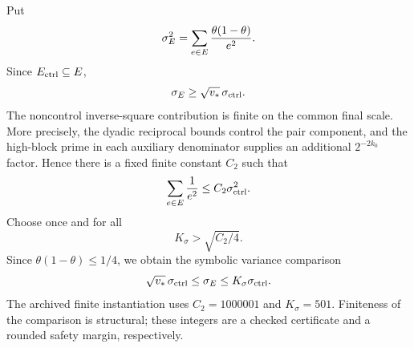 Put
\begin{equation}\label{eq:sigmaE}
 \sigma_E^2=\sum_{e\in E}\frac{\theta(1-\theta)}{e^2}.
\end{equation}
Since $E_{\mathrm{ctrl}}\subseteq E$,
\begin{equation}\label{eq:variance-lower}
 \sigma_E\ge\sqrt{v_*}\,\sigma_{\mathrm{ctrl}}.
\end{equation}
The noncontrol inverse-square contribution is finite on the common final scale.
More precisely, the dyadic reciprocal bounds control the pair component, and
the high-block prime in each auxiliary denominator supplies an additional
$2^{-2k_0}$ factor.  Hence there is a fixed finite constant $C_2$ such that
\begin{equation}\label{eq:inverse-square-constant}
 \sum_{e\in E}\frac1{e^2}\le C_2\sigma_{\mathrm{ctrl}}^2.
\end{equation}
Choose once and for all
\begin{equation}\label{eq:Ksigma-choice}
 K_\sigma>\sqrt{C_2/4}.
\end{equation}
Since $\theta(1-\theta)\le1/4$, we obtain the symbolic variance comparison
\begin{equation}\label{eq:variance-comparison}
 \sqrt{v_*}\,\sigma_{\mathrm{ctrl}}\le\sigma_E\le K_\sigma\sigma_{\mathrm{ctrl}}.
\end{equation}
The archived finite instantiation uses $C_2=1000001$ and $K_\sigma=501$.
Finiteness of the comparison is structural; these integers are a checked
certificate and a rounded safety margin, respectively.
